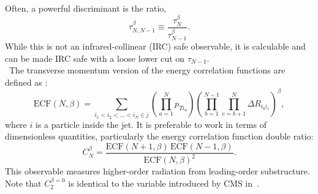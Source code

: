 Often, a  powerful discriminant is  the ratio,
%
\begin{equation}
\tau_{N,N-1}^{\beta} \equiv \frac{\tau_N^{\beta}}{\tau_{N-1}^{\beta}}.
\end{equation}
%
While this is not an infrared-collinear (IRC) safe observable, it is calculable \cite{Larkoski:2013paa} and can be made IRC safe with a loose lower cut on $\tau_{N-1}$.\\


~The transverse momentum version of the energy correlation functions are defined as \cite{Larkoski:2013eya}:
%
\begin{equation}
\mathrm{ECF}(N,\beta) = \sum_{i_1 < i_2<\ldots<i_N \in j} \left(\prod_{a=1}^N p_{T i_a}\right)\left( \prod_{b=1}^{N-1} \prod_{c=b+1}^N \Delta R_{i_b i_c}\right)^\beta,
\end{equation}
%
where $i$ is a particle inside the jet. It is preferable to work in terms of dimensionless quantities, particularly the energy correlation function double ratio:
%
\begin{equation}
C_N^{\beta} = \frac{\mathrm{ECF}(N+1,\beta)\,\mathrm{ECF}(N-1,\beta)}{\mathrm{ECF}(N,\beta)^2}.
\end{equation}
%
This observable measures higher-order radiation from leading-order substructure. Note that $C_2^{\beta=0}$ is identical to the variable \ptd introduced by CMS in~\cite{Chatrchyan:2012sn}. 

